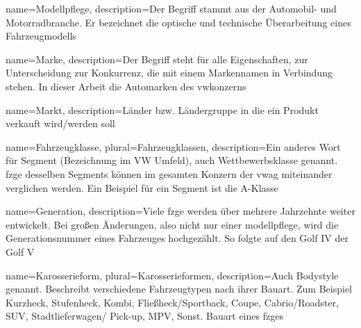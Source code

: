  {
	name=Modellpflege,
	description={Der Begriff stammt aus der Automobil- und Motorradbranche. Er bezeichnet die optische und technische \"Uberarbeitung eines Fahrzeugmodells}
}

	
	

	
 {
	name=Marke,
	description={Der Begriff steht f\"ur alle Eigenschaften, zur Unterscheidung zur Konkurrenz, die mit einem Markennamen in Verbindung stehen. In dieser Arbeit die Automarken des \gls{vwkonzern}s}}


 {
	name=Markt,
	description={L\"ander bzw. L\"andergruppe in die ein Produkt verkauft wird/werden soll}}

 {
	name=Fahrzeugklasse,
	plural=Fahrzeugklassen,
	description={Ein anderes Wort f\"ur Segment (Bezeichnung im VW Umfeld), auch Wettbewerbsklasse genannt. \gls{fzg}e desselben Segments k\"onnen im gesamten Konzern der \gls{vwag} miteinander verglichen werden. Ein Beispiel f\"ur ein Segment ist die A-Klasse}}
	
 {
	name=Generation,
	description={Viele \gls{fzg}e werden \"uber mehrere Jahrzehnte weiter entwickelt. Bei gro\ss en \"Anderungen, also nicht nur einer \gls{modellpflege}, wird die Generationsnummer eines Fahrzeuges hochgez\"ahlt. So folgte auf den Golf IV der Golf V}}
	
 {
	name=Karosserieform,
	plural=Karosserieformen,
	description={Auch Bodystyle genannt. Beschreibt verschiedene Fahrzeugtypen nach ihrer Bauart. Zum Beispiel Kurzheck, Stufenheck, Kombi, Flie{\ss}heck/Sportback, Coupe, Cabrio/Roadster, SUV, Stadtlieferwagen/ Pick-up, MPV, Sonst. Bauart eines \gls{fzg}es }}
	
